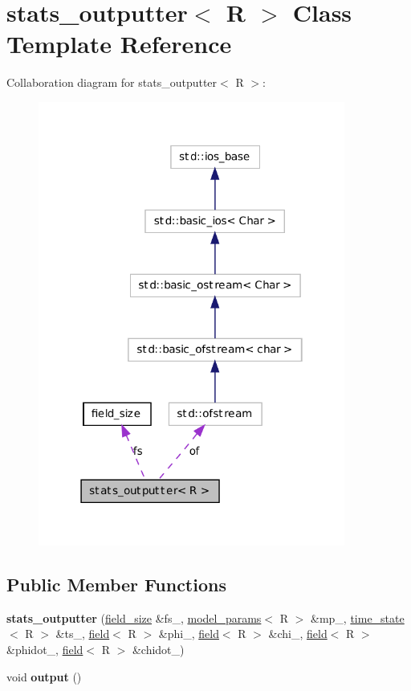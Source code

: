 \hypertarget{classstats__outputter}{
\section{stats\_\-outputter$<$ R $>$ Class Template Reference}
\label{classstats__outputter}
}


Collaboration diagram for stats\_\-outputter$<$ R $>$:
\nopagebreak
\begin{figure}[H]
\begin{center}
\leavevmode
\includegraphics[width=286pt]{classstats__outputter__coll__graph}
\end{center}
\end{figure}
\subsection*{Public Member Functions}
\begin{DoxyCompactItemize}
\item 
\hypertarget{classstats__outputter_a12a507e68b035ff1d5bd588baf9e0a31}{
{\bfseries stats\_\-outputter} (\hyperlink{structfield__size}{field\_\-size} \&fs\_\-, \hyperlink{structmodel__params}{model\_\-params}$<$ R $>$ \&mp\_\-, \hyperlink{structtime__state}{time\_\-state}$<$ R $>$ \&ts\_\-, \hyperlink{classfield}{field}$<$ R $>$ \&phi\_\-, \hyperlink{classfield}{field}$<$ R $>$ \&chi\_\-, \hyperlink{classfield}{field}$<$ R $>$ \&phidot\_\-, \hyperlink{classfield}{field}$<$ R $>$ \&chidot\_\-)}
\label{classstats__outputter_a12a507e68b035ff1d5bd588baf9e0a31}

\item 
\hypertarget{classstats__outputter_aaeccf7473d48bec8a138e30f93f9fb9a}{
void {\bfseries output} ()}
\label{classstats__outputter_aaeccf7473d48bec8a138e30f93f9fb9a}

\end{DoxyCompactItemize}
